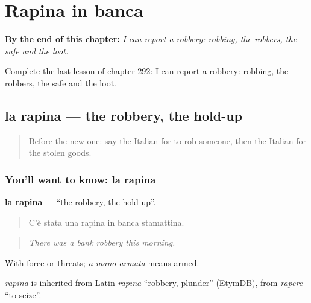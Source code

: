 
\chapter{Rapina in banca}
\label{ch:it-rapina-in-banca}

\begin{chapteropening}
\textbf{By the end of this chapter:} \emph{I can report a robbery: robbing, the robbers, the safe and the loot.}

Complete the last lesson of chapter 292: I can report a robbery: robbing, the robbers, the safe and the loot.
\end{chapteropening}

\section[la rapina]{la rapina — the robbery, the hold-up}

\label{lesson:IT-C292-rapina}



\begin{quote}
Before the new one: say the Italian for to rob someone, then the Italian for the stolen goods.
\end{quote}

\subsection*{You'll want to know: la rapina}
\textbf{la rapina} — \textquotedblleft{}the robbery, the hold-up\textquotedblright{}.

\begin{quote}
C'è stata una rapina in banca stamattina.
\end{quote}

\begin{quote}
\emph{There was a bank robbery this morning.}
\end{quote}

With force or threats; \emph{a mano armata} means armed.

\begin{cousinweb}
\emph{rapina} is inherited from Latin \emph{rapīna} \textquotedblleft{}robbery, plunder\textquotedblright{} (EtymDB), from \emph{rapere} \textquotedblleft{}to seize\textquotedblright{}.
\end{cousinweb}

